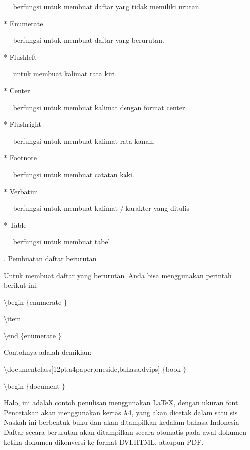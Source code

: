 ~~ berfungsi untuk membuat daftar yang tidak memiliki urutan. \par
* Enumerate \par
~~ berfungsi untuk membuat daftar yang berurutan. \par
* Flushleft \par
~~ untuk membuat kalimat rata kiri. \par
* Center \par
~~ berfungsi untuk membuat kalimat dengan format center. \par
* Flushright \par
~~ berfungsi untuk membuat kalimat rata kanan. \par
* Footnote \par
~~ berfungsi untuk membuat catatan kaki. \par
* Verbatim \par
~~ berfungsi untuk membuat kalimat / karakter yang ditulis \par
* Table
 \par
~~ berfungsi untuk membuat tabel.  \par 
\vspace{12pt}
. Pembuatan daftar berurutan \par
Untuk membuat daftar yang berurutan, Anda bisa menggunakan perintah berikut ini: \par
{\fontsize{10pt}{10pt}\selectfont  $  \setminus  $begin $  \{  $enumerate $  \}  $} \par
{\fontsize{10pt}{10pt}\selectfont  $  \setminus  $item} \par
{\fontsize{10pt}{10pt}\selectfont  $  \setminus  $end $  \{  $enumerate $  \}  $} \par
\vspace{12pt}
Contohnya adalah demikian: \par
{\fontsize{10pt}{10pt}\selectfont  $  \setminus  $documentclass[12pt,a4paper,oneside,bahasa,dvips] $  \{  $book $  \}  $} \par
{\fontsize{10pt}{10pt}\selectfont  $  \setminus  $begin $  \{  $document $  \}  $} \par
\vspace{10pt}
{\fontsize{10pt}{10pt}\selectfont Halo, ini adalah contoh penulisan menggunakan LaTeX, dengan ukuran font Pencetakan akan menggunakan kertas A4, yang akan dicetak dalam satu sis Naskah ini berbentuk buku dan akan ditampilkan kedalam bahasa Indonesia Daftar secara berurutan akan ditampilkan secara otomatis pada awal {\fontsize{9pt}{9pt}\selectfont dokumen ketika dokumen dikonversi ke format DVI,HTML, ataupun PDF.}} \par

